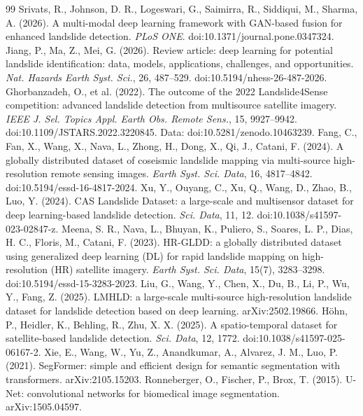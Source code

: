 \begin{thebibliography}{99}
 Srivats, R., Johnson, D. R., Logeswari, G., Saimirra, R., Siddiqui, M., Sharma, A. (2026). A multi-modal deep learning framework with GAN-based fusion for enhanced landslide detection. \emph{PLoS ONE}. doi:10.1371/journal.pone.0347324.
 Jiang, P., Ma, Z., Mei, G. (2026). Review article: deep learning for potential landslide identification: data, models, applications, challenges, and opportunities. \emph{Nat. Hazards Earth Syst. Sci.}, 26, 487--529. doi:10.5194/nhess-26-487-2026.
 Ghorbanzadeh, O., et al. (2022). The outcome of the 2022 Landslide4Sense competition: advanced landslide detection from multisource satellite imagery. \emph{IEEE J. Sel. Topics Appl. Earth Obs. Remote Sens.}, 15, 9927--9942. doi:10.1109/JSTARS.2022.3220845. Data: doi:10.5281/zenodo.10463239.
 Fang, C., Fan, X., Wang, X., Nava, L., Zhong, H., Dong, X., Qi, J., Catani, F. (2024). A globally distributed dataset of coseismic landslide mapping via multi-source high-resolution remote sensing images. \emph{Earth Syst. Sci. Data}, 16, 4817--4842. doi:10.5194/essd-16-4817-2024.
 Xu, Y., Ouyang, C., Xu, Q., Wang, D., Zhao, B., Luo, Y. (2024). CAS Landslide Dataset: a large-scale and multisensor dataset for deep learning-based landslide detection. \emph{Sci. Data}, 11, 12. doi:10.1038/s41597-023-02847-z.
 Meena, S. R., Nava, L., Bhuyan, K., Puliero, S., Soares, L. P., Dias, H. C., Floris, M., Catani, F. (2023). HR-GLDD: a globally distributed dataset using generalized deep learning (DL) for rapid landslide mapping on high-resolution (HR) satellite imagery. \emph{Earth Syst. Sci. Data}, 15(7), 3283--3298. doi:10.5194/essd-15-3283-2023.
 Liu, G., Wang, Y., Chen, X., Du, B., Li, P., Wu, Y., Fang, Z. (2025). LMHLD: a large-scale multi-source high-resolution landslide dataset for landslide detection based on deep learning. arXiv:2502.19866.
 H\"ohn, P., Heidler, K., Behling, R., Zhu, X. X. (2025). A spatio-temporal dataset for satellite-based landslide detection. \emph{Sci. Data}, 12, 1772. doi:10.1038/s41597-025-06167-2.
 Xie, E., Wang, W., Yu, Z., Anandkumar, A., Alvarez, J. M., Luo, P. (2021). SegFormer: simple and efficient design for semantic segmentation with transformers. arXiv:2105.15203.
 Ronneberger, O., Fischer, P., Brox, T. (2015). U-Net: convolutional networks for biomedical image segmentation. arXiv:1505.04597.

\end{thebibliography}
